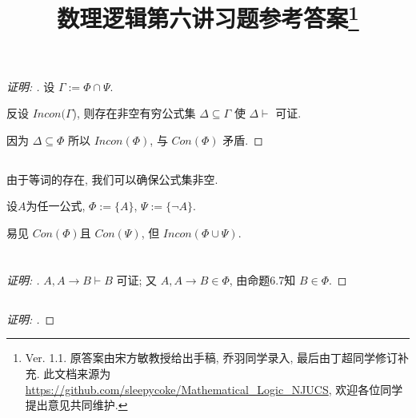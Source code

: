 \documentclass{article}
\begin{document}
\begin{CJK*}{UTF8}{gbsn}
\title{数理逻辑第六讲习题参考答案\footnote{Ver. 1.1. 原答案由宋方敏教授给出手稿, 乔羽同学录入, 最后由丁超同学修订补充. 此文档来源为\mbox{\url{https://github.com/sleepycoke/Mathematical_Logic_NJUCS}},
 欢迎各位同学提出意见共同维护. 
}}
\maketitle
\section{}
\subsection{}
\begin{proof}[\emph{证明: }]	
设 $\Gamma := \Phi \cap \Psi $.  

反设 $Incon(\Gamma$), 则存在非空有穷公式集 $\Delta \subseteq \Gamma$ 使 $\Delta \vdash$ 可证.  

因为 $\Delta \subseteq \Phi $ 所以 $Incon(\Phi)$, 与 $Con (\Phi)$ 矛盾. 
\end{proof}


\subsection{}
由于等词的存在, 我们可以确保公式集非空. 

设$A$为任一公式,
$\Phi := \{ A\}$, $\Psi := \{  \neg A \}$. 

易见 $Con ({\Phi})$且 $Con ({\Psi})$, 但 $Incon (\Phi \cup \Psi)$.

\section{}
\subsection{}
\begin{proof}[\emph{证明: }]
$A , A \rightarrow B \vdash B$ 可证; 又 $A,A\rightarrow B \in \Phi$, 
由命题6.7知 $B \in \Phi$. 
\end{proof}

\subsection{}
\begin{proof}[\emph{证明: }]


\end{proof}
\end{CJK*}
\end{document}
